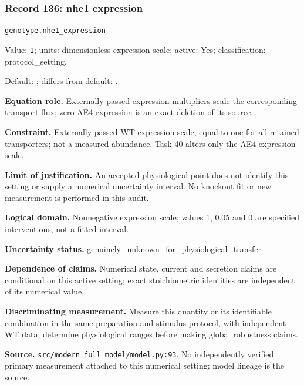 \subsubsection*{Record 136: nhe1 expression}
{\small \nolinkurl{genotype.nhe1_expression}\par

Value: \texttt{1}; units: dimensionless expression scale; active: Yes; classification: protocol\_setting.\par

Default: ; differs from default: .\par

\textbf{Equation role.} Externally passed expression multipliers scale the corresponding transport flux; zero AE4 expression is an exact deletion of its source.\par

\textbf{Constraint.} Externally passed WT expression scale, equal to one for all retained transporters; not a measured abundance. Task 40 alters only the AE4 expression scale.\par

\textbf{Limit of justification.} An accepted physiological point does not identify this setting or supply a numerical uncertainty interval. No knockout fit or new measurement is performed in this audit.\par

\textbf{Logical domain.} Nonnegative expression scale; values 1, 0.05 and 0 are specified interventions, not a fitted interval.\par

\textbf{Uncertainty status.} genuinely\_unknown\_for\_physiological\_transfer\par

\textbf{Dependence of claims.} Numerical state, current and secretion claims are conditional on this active setting; exact stoichiometric identities are independent of its numerical value.\par

\textbf{Discriminating measurement.} Measure this quantity or its identifiable combination in the same preparation and stimulus protocol, with independent WT data; determine physiological ranges before making global robustness claims.\par

\textbf{Source.} \nolinkurl{src/modern_full_model/model.py:93}. No independently verified primary measurement attached to this numerical setting; model lineage is the source.\par}

